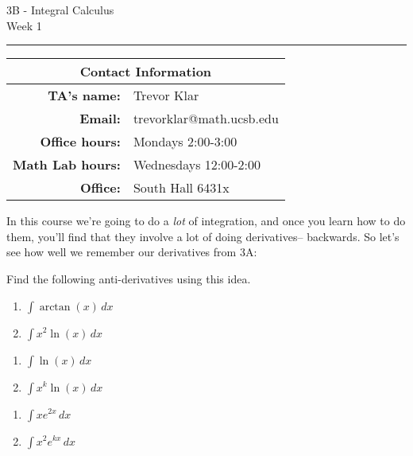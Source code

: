 \documentclass[12pt,letterpaper]{article}
\begin{document}
\thispagestyle{fancy}
\begin{center}
3B - Integral Calculus \\
Week 1 %
\end{center}

\hrule

\begin{center}
\begin{tabular}{|rl|}
\hline
\multicolumn{2}{|c|}{Contact Information} \\
\hline
\bf{TA's name:} & Trevor Klar \\
\bf{Email:} & trevorklar@math.ucsb.edu \\
\bf{Office hours:} & Mondays 2:00-3:00 \\
\bf{Math Lab hours:} & Wednesdays 12:00-2:00 \\
\bf{Office:} & South Hall 6431x \\
\hline
\end{tabular}
\end{center}


In this course we're going to do a \emph{lot} of integration, and once you learn how to do them, you'll find that they involve a lot of doing derivatives-- backwards. So let's see how well we remember our derivatives from 3A:
\bigskip


Find the following anti-derivatives using this idea.
\begin{multicols}{2}
  \begin{enumerate}[series=problems]
  \item $\displaystyle\int \arctan(x)\,dx$

  \item $\displaystyle \int x^2 \ln(x) \, dx$
  \end{enumerate}
\end{multicols}
\vfill

\begin{multicols}{2}
  \begin{enumerate}[resume=problems]
  \item $\displaystyle \int \ln(x) \, dx$

  \item $\displaystyle \int x^k \ln(x) \, dx$
  \end{enumerate}
\end{multicols}
\vfill

\begin{multicols}{2}
  \begin{enumerate}[resume=problems]
  \item $\displaystyle\int x e^{2x}\,dx$

  \item $\displaystyle \int x^2 e^{kx} \, dx$

  \end{enumerate}
\end{multicols}
\vfill
\end{document}
